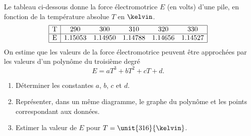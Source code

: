 \begin{exercice}\label{exoSC_serie3-0002}

	Le tableau ci-dessous donne la force électromotrice $E$ (en volts) d'une pile, en fonction de la température absolue $T$ en $\kelvin$.
	\[
		\begin{array}{|c|ccccc|}
			\hline
			\text{T}& 290	&	300	&	310	&	320	&	330 \\
			\hline
			\text{E}& 1.15053&	1.14950	&	1.14788	&	1.14656	&	1.14527  \\
			\hline
		\end{array}
	\]
	On estime que les valeurs de la force électromotrice peuvent être approchées par les valeurs d'un polynôme du troisième degré
	\begin{equation}
		E=aT^3+bT^2+cT+d.
	\end{equation}
	\begin{enumerate}

		\item
			Déterminer les constantes $a$, $b$, $c$ et $d$.
		\item
			Représenter, dans un même diagramme, le graphe du polynôme et les points correspondant aux données.
		\item
			Estimer la valeur de $E$ pour $T=\unit{316}{\kelvin}$.

	\end{enumerate}
	

\end{exercice}
